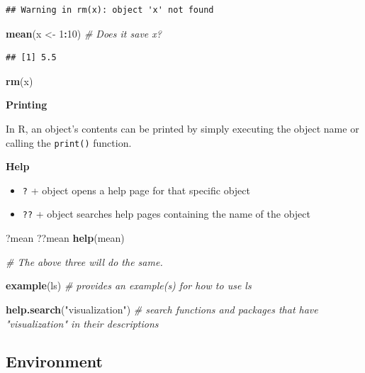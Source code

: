 \documentclass[
]{book}
\newenvironment{Shaded}{\begin{snugshade}}{\end{snugshade}}
\newcommand{\CommentTok}[1]{\textcolor[rgb]{0.56,0.35,0.01}{\textit{#1}}}
\newcommand{\DecValTok}[1]{\textcolor[rgb]{0.00,0.00,0.81}{#1}}
\newcommand{\FunctionTok}[1]{\textcolor[rgb]{0.13,0.29,0.53}{\textbf{#1}}}
\newcommand{\NormalTok}[1]{#1}
\newcommand{\OtherTok}[1]{\textcolor[rgb]{0.56,0.35,0.01}{#1}}
\newcommand{\SpecialCharTok}[1]{\textcolor[rgb]{0.81,0.36,0.00}{\textbf{#1}}}
\newcommand{\StringTok}[1]{\textcolor[rgb]{0.31,0.60,0.02}{#1}}
\providecommand{\tightlist}{%
  \setlength{\itemsep}{0pt}\setlength{\parskip}{0pt}}
\begin{document}
\begin{verbatim}
## Warning in rm(x): object 'x' not found
\end{verbatim}

\begin{Shaded}
\begin{Highlighting}[]
\FunctionTok{mean}\NormalTok{(x }\OtherTok{\textless{}{-}} \DecValTok{1}\SpecialCharTok{:}\DecValTok{10}\NormalTok{) }\CommentTok{\# Does it save x?}
\end{Highlighting}
\end{Shaded}

\begin{verbatim}
## [1] 5.5
\end{verbatim}

\begin{Shaded}
\begin{Highlighting}[]
\FunctionTok{rm}\NormalTok{(x)}
\end{Highlighting}
\end{Shaded}

\textbf{Printing}

In R, an object's contents can be printed by simply executing the object name or calling the \texttt{print()} function.

\textbf{Help}

\begin{itemize}
\tightlist
\item
  \texttt{?} + object opens a help page for that specific object
\item
  \texttt{??} + object searches help pages containing the name of the object
\end{itemize}

\begin{Shaded}
\begin{Highlighting}[]
\NormalTok{?mean}
\NormalTok{??mean}
\FunctionTok{help}\NormalTok{(mean)}

\CommentTok{\# The above three will do the same.}

\FunctionTok{example}\NormalTok{(ls) }\CommentTok{\# provides an example(s) for how to use ls}

\FunctionTok{help.search}\NormalTok{(}\StringTok{"visualization"}\NormalTok{) }\CommentTok{\# search functions and packages that have "visualization" in their descriptions}
\end{Highlighting}
\end{Shaded}

\subsection{Environment}\label{environment}
\end{document}
